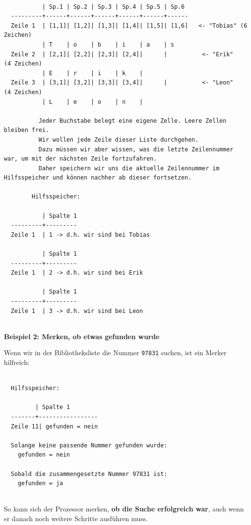 \documentclass{article}
\begin{document}
        \begin{verbatim}

           | Sp.1 | Sp.2 | Sp.3 | Sp.4 | Sp.5 | Sp.6
  ---------+------+------+------+------+------+------
  Zeile 1  | [1,1]| [1,2]| [1,3]| [1,4]| [1,5]| [1,6]   <- "Tobias" (6 Zeichen)
           | T    | o    | b    | i    | a    | s
  Zeile 2  | [2,1]| [2,2]| [2,3]| [2,4]|      |          <- "Erik"   (4 Zeichen)
           | E    | r    | i    | k    |
  Zeile 3  | [3,1]| [3,2]| [3,3]| [3,4]|      |          <- "Leon"   (4 Zeichen)
           | L    | e    | o    | n    |

          Jeder Buchstabe belegt eine eigene Zelle. Leere Zellen bleiben frei.
          Wir wollen jede Zeile dieser Liste durchgehen.
          Dazu müssen wir aber wissen, was die letzte Zeilennummer war, um mit der nächsten Zeile fortzufahren.
          Daher speichern wir uns die aktuelle Zeilennummer im Hilfsspeicher und können nachher ab dieser fortsetzen.

        Hilfsspeicher:

           | Spalte 1
  ---------+---------
  Zeile 1  | 1 -> d.h. wir sind bei Tobias

           | Spalte 1
  ---------+---------
  Zeile 1  | 2 -> d.h. wir sind bei Erik

           | Spalte 1
  ---------+---------
  Zeile 1  | 3 -> d.h. wir sind bei Leon
        
\end{verbatim}

        
\textbf{Beispiel 2: Merken, ob etwas gefunden wurde}


        
Wenn wir in der Bibliotheksliste die Nummer \texttt{97831} suchen, ist ein Merker hilfreich:


        \begin{verbatim}

  Hilfsspeicher:

         | Spalte 1
  -------+-----------------
  Zeile 11| gefunden = nein

  Solange keine passende Nummer gefunden wurde:
    gefunden = nein

  Sobald die zusammengesetzte Nummer 97831 ist:
    gefunden = ja
        
\end{verbatim}

        
So kann sich der Prozessor merken, \textbf{ob die Suche erfolgreich war}, auch wenn er danach noch weitere Schritte ausführen muss.
\end{document}
